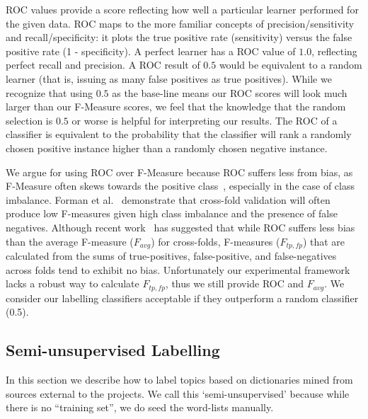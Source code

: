 \documentclass[smallextended]{svjour3}       %
\begin{document}
ROC values provide a score %
 reflecting how well a particular learner performed for the given data. 
ROC maps to the more familiar concepts of precision/sensitivity and recall/specificity: it plots the true positive rate (sensitivity) versus the false
positive rate (1 - specificity). 
A perfect learner has a ROC value of $1.0$, reflecting perfect recall and precision. 
A ROC result of $0.5$ would be equivalent to a random learner (that
is, issuing as many false positives as true positives). While we
recognize that using $0.5$ as the base-line means our ROC scores will
look much larger than our F-Measure scores, we feel that the knowledge
that the random selection is $0.5$ or worse is helpful for interpreting our results.
The %
ROC of a classifier is equivalent to the probability that the classifier will rank a randomly chosen positive instance higher than a randomly chosen
negative instance.

We argue for using ROC over F-Measure because ROC suffers less from
bias, as F-Measure often skews towards the positive
class~\cite{flach-icml03,Forman:2010:ACS:1882471.1882479}, especially
in the case of class imbalance. Forman et
al.~\cite{Forman:2010:ACS:1882471.1882479} demonstrate that cross-fold
validation will often produce low F-measures given high class
imbalance and the presence of false negatives.
Although
recent work~\cite{Forman:2010:ACS:1882471.1882479} has suggested that while ROC suffers less bias than
the average F-measure ($F_{avg}$) for cross-folds, F-measures ($F_{tp,fp}$) that are calculated from
the sums of true-positives,
false-positive, and false-negatives across folds tend to exhibit no
bias. Unfortunately our experimental framework lacks a robust way to
calculate $F_{tp,fp}$, thus we still provide ROC and $F_{avg}$.
We consider our labelling classifiers acceptable if they outperform a random classifier (0.5). 


\subsection{Semi-unsupervised Labelling}
\label{sec:unsuplabelling}

In this section we describe how to label topics based on dictionaries
mined from sources external to the projects. We call this `semi-unsupervised' because while there is no ``training set'', we do seed the word-lists manually.
\end{document}
